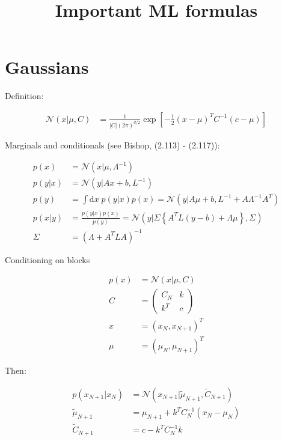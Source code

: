 \documentclass[a4paper]{scrartcl}
\title{Important ML formulas}
\date{}
\begin{document}
\maketitle

\section{Gaussians}

Definition:

\begin{align}
    \mathcal{N}(x|\mu, C) &= \frac{1}{|C| (2 \pi)^{d/2}} \exp\left[ -\frac{1}{2} (x - \mu)^T C^{-1} (c - \mu) \right]
\end{align}

Marginals and conditionals (see Bishop, (2.113) - (2.117)):
    
\begin{align}
    p(x) &= \mathcal{N}(x|\mu, \Lambda^{-1}) \\
    p(y|x) &= \mathcal{N}(y|A x + b, L^{-1}) \\
    p(y) &= \int \mathrm{d}x\; p(y|x)p(x) 
        = \mathcal{N}(y|A\mu + b, L^{-1} + A \Lambda^{-1} A^T) \\
    p(x|y) &= \frac{p(y|x)p(x)}{p(y)} 
        = \mathcal{N}(y|\Sigma \left\{ A^T L (y - b) + \Lambda \mu \right\}, \Sigma) \\
    \Sigma &= \left( \Lambda  + A^T L A \right)^{-1}
\end{align}

Conditioning on blocks

\begin{align}
    p(x) &= \mathcal{N}(x|\mu, C) \\
    C &= \begin{pmatrix}
        C_N & k \\
        k^T & c
    \end{pmatrix} \\
    x &= (x_N, x_{N+1})^T \\
    \mu &= (\mu_N, \mu_{N+1})^T
\end{align}

Then:

\begin{align}
    p(x_{N+1}|x_{N}) &= 
        \mathcal{N}\left( x_{N+1} | \tilde{\mu}_{N+1}, \tilde{C}_{N+1} \right) \\
    \tilde{\mu}_{N+1} &= \mu_{N+1} + k^T C_N^{-1} (x_N - \mu_N) \\
    \tilde{C}_{N+1} &= c - k^T C_N^{-1} k
\end{align}
\end{document}
